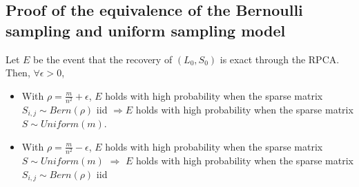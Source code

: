 \subsection{Proof of the equivalence of the Bernoulli sampling and uniform sampling model }
\begin{theorem}
Let $E$ be the event that the recovery of $(L_{0},S_{0})$ is exact
through the RPCA. Then, $\forall\epsilon>0$,
\end{theorem}

\begin{itemize}
\item With $\rho=\frac{m}{n^{2}}+\epsilon$, $E$ holds with high probability when the sparse matrix $S_{i,j}\sim Bern(\rho)$ iid $\Longrightarrow$$E$ holds with high probability when the sparse matrix $S\sim Uniform(m)$. 
\item With $\rho=\frac{m}{n^{2}}-\epsilon$, $E$ holds with high probability when the sparse matrix $S\sim Uniform(m)$ $\Longrightarrow$ $E$ holds with high probability when the sparse matrix $S_{i,j}\sim Bern(\rho)$
iid 
\end{itemize}

